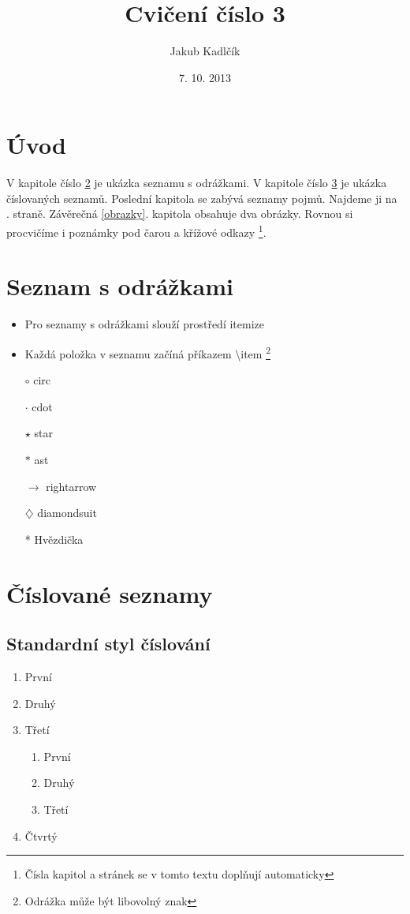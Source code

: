 \documentclass[10pt,a4paper]{article}
\title{Cvičení číslo 3}
\author{Jakub Kadlčík}
\date{7. 10. 2013}
\begin{document}
	\maketitle
	\tableofcontents
	
	\section{Úvod}
	V kapitole číslo \ref{seznam-s-odrazkami} je ukázka seznamu s odrážkami. V kapitole číslo \ref{cislovany-seznam} je ukázka číslovaných seznamů. Poslední kapitola se zabývá seznamy pojmů. Najdeme ji na \pageref{seznam-pojmu}. straně. Závěrečná \ref{obrazky}. kapitola obsahuje dva obrázky. Rovnou si procvičíme i poznámky pod čarou a křížové odkazy \footnote{Čísla kapitol a stránek se v tomto textu doplňují automaticky}.
	
	\section{Seznam s odrážkami}
	\label{seznam-s-odrazkami}
	\begin{itemize}
		\item Pro seznamy s odrážkami slouží prostředí itemize
		\item Každá položka v seznamu začíná příkazem \textbackslash{}item \footnote{Odrážka může být libovolný znak}
		\item[$\circ$] circ
		\item[$\cdot$] cdot	
		\item[$\star$] star
		\item[$\ast$] ast
		\item[$\rightarrow$] rightarrow
		\item[$\diamondsuit$] diamondsuit
		\item[*] Hvězdička
	\end{itemize}
	
	\section{Číslované seznamy}
	\label{cislovany-seznam}
		\subsection{Standardní styl číslování}
			\begin{enumerate}
				\item První
				\item Druhý
				\item Třetí
					\begin{enumerate}
						\item První
						\item Druhý
						\item Třetí
					\end{enumerate}
				\item Čtvrtý	
			\end{enumerate}
\end{document}

